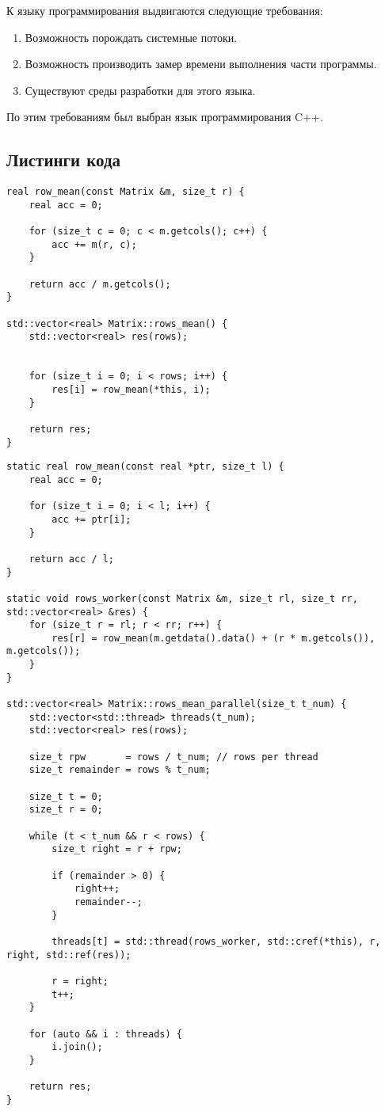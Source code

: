 К языку программирования выдвигаются следующие требования:

\begin{enumerate}
	\item Возможность порождать системные потоки.
	\item Возможность производить замер времени выполнения части программы.
	\item Существуют среды разработки для этого языка.
\end{enumerate}

По этим требованиям был выбран язык программирования C++.

\subsection{Листинги кода}

\begin{lstlisting}[caption={Последовательный алгоритм}, label=list:iter, language={}]
real row_mean(const Matrix &m, size_t r) {
	real acc = 0;

	for (size_t c = 0; c < m.getcols(); c++) {
		acc += m(r, c);
	}

	return acc / m.getcols();
}

std::vector<real> Matrix::rows_mean() {
	std::vector<real> res(rows);


	for (size_t i = 0; i < rows; i++) {
		res[i] = row_mean(*this, i);
	}

	return res;
}
\end{lstlisting}

\begin{lstlisting}[caption=Параллельный алгоритм, label=list:iter, language={}]
static real row_mean(const real *ptr, size_t l) {
    real acc = 0;

    for (size_t i = 0; i < l; i++) {
        acc += ptr[i];
    }

    return acc / l;
}

static void rows_worker(const Matrix &m, size_t rl, size_t rr, std::vector<real> &res) {
    for (size_t r = rl; r < rr; r++) {
        res[r] = row_mean(m.getdata().data() + (r * m.getcols()), m.getcols());
    }
}

std::vector<real> Matrix::rows_mean_parallel(size_t t_num) {
    std::vector<std::thread> threads(t_num);
    std::vector<real> res(rows);

    size_t rpw       = rows / t_num; // rows per thread
    size_t remainder = rows % t_num;

    size_t t = 0;
    size_t r = 0;

    while (t < t_num && r < rows) {
        size_t right = r + rpw;

        if (remainder > 0) {
            right++;
            remainder--;
        }

        threads[t] = std::thread(rows_worker, std::cref(*this), r, right, std::ref(res));
        
        r = right;
        t++;
    }

    for (auto && i : threads) {
        i.join();
    }

    return res;
}
\end{lstlisting}

